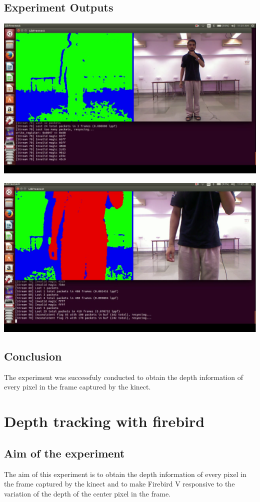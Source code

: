 \begin{flushleft}
\begin{enumerate}
\end{enumerate}
\medskip
\subsection{\textbf{ Experiment Outputs}}
\includegraphics[scale = 0.5]{e121}

\medskip
\includegraphics[scale = 0.5]{e122}
\medskip
\subsection{\textbf{ Conclusion}}
The experiment was successfuly conducted to obtain the depth information of every pixel in the frame captured by the kinect.
\medskip
\newpage

\section{\textbf{ Depth tracking with firebird}}

\label{4.13}
\medskip
\subsection{\textbf{ Aim of the experiment}}
The aim of this experiment is to obtain the depth information of every pixel in the frame captured by the kinect and to make Firebird V responsive to the variation of the depth of the center pixel in the frame.
\medskip


\end{flushleft}
